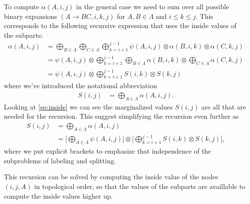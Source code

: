   To compute $\alpha(A, i, j)$ in the general case we need to sum over all possible binary expansions $(A \to B C, i, k, j)$ for $A, B \in \Lambda$ and $i \leq k \leq j$. This corresponds to the following recursive expression that uses the inside values of the subparts:
  \begin{align*}
  \label{eq:inside}
    \alpha(A, i, j)
      &= \bigoplus_{B \in \Lambda} \bigoplus_{C \in \Lambda} \bigoplus_{k=i+1}^{j-1} \psi(A, i, j) \otimes \alpha(B,i,k) \otimes \alpha(C,k,j) \\
      &= \psi(A, i, j) \otimes \bigoplus_{k=i+1}^{j-1} \bigoplus_{B \in \Lambda} \alpha(B,i,k) \otimes \bigoplus_{C \in \Lambda} \alpha(C,k,j) \\
      &= \psi(A, i, j) \otimes \bigoplus_{k=i+1}^{j-1} S(i,k) \otimes S(k,j)
  \end{align*}
  where we've introduced the notational abbreviation
  \begin{align*}
      S(i,j) &= \bigoplus_{A \in \Lambda} \alpha(A,i,j).
  \end{align*}
  Looking at \ref{eq:inside} we can see the marginalized values $S(i, j)$ are all that are needed for the recursion. This suggest simplifying the recursion even further as
  \begin{align*}
  \label{eq:inside-simplified}
    S(i, j)
      &= \bigoplus_{A \in \Lambda} \alpha(A,i,j) \\
      &= \Bigg[ \bigoplus_{A \in \Lambda} \psi(A, i, j) \Bigg] \otimes \Bigg[\bigoplus_{k=i+1}^{j-1} S(i,k) \otimes  S(k,j) \Bigg],
  \end{align*}
  where we put explicit brackets to emphasize that independence of the subproblems of labeling and splitting.

  This recursion can be solved by computing the inside value of the nodes $(i, j, A)$ in topological order, so that the values of the subparts are availlable to compute the inside values higher up.

